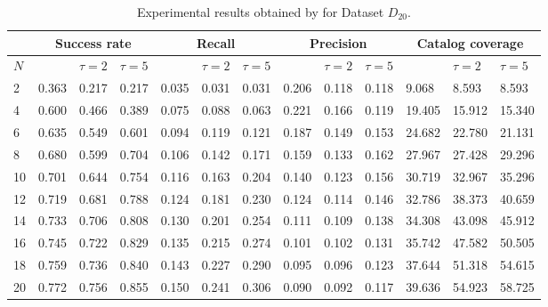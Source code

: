 \begin{table*}[t!]
	\small
	\caption{Experimental results obtained by \TFb for Dataset $D_{20}$.}
	\begin{tabular}{|l | lll| lll |lll |lll|}
		\hline
		& \multicolumn{3}{c|}{\textbf{Success rate}} & \multicolumn{3}{c|}{\textbf{Recall}} & \multicolumn{3}{c|}{\textbf{Precision}} & \multicolumn{3}{c|}{ \textbf{Catalog coverage}} \\ \hline
		$N$  & \MNB     & $\tau=2$   & $\tau=5$  & \MNB      & $\tau=2$   & $\tau=5$   & \MNB       & $\tau=2$   & $\tau=5$    & \MNB        & $\tau=2$     & $\tau=5$      \\ \hline
		
		2  & 0.363     & 0.217    & 0.217  & 0.035   & 0.031   & 0.031  & 0.206    & 0.118   & 0.118   & 9.068     & 8.593      & 8.593      \\ \hline		
		4  & 0.600     & 0.466    & 0.389  & 0.075   & 0.088   & 0.063  & 0.221    & 0.166   & 0.119   & 19.405    & 15.912     & 15.340     \\ \hline
		6  & 0.635     & 0.549    & 0.601  & 0.094   & 0.119   & 0.121  & 0.187    & 0.149   & 0.153   & 24.682    & 22.780     & 21.131     \\ \hline
		\rowcolor{Gray}
		8  & 0.680    & 0.599    & 0.704  & 0.106   & 0.142   & 0.171  & 0.159    & 0.133    & 0.162   & 27.967    & 27.428     & 29.296     \\ \hline
		10 & 0.701    & 0.644    & 0.754  & 0.116   & 0.163   & 0.204  & 0.140    & 0.123    & 0.156      & 30.719    & 32.967     & 35.296  \\ \hline		
		12 & 0.719    & 0.681    & 0.788  & 0.124   & 0.181   & 0.230  & 0.124    & 0.114    & 0.146   & 32.786    & 38.373     & 40.659     \\ \hline		
		14 & 0.733    & 0.706    & 0.808  & 0.130   & 0.201   & 0.254  & 0.111    & 0.109    & 0.138   & 34.308    & 43.098     & 45.912     \\ \hline		
		16 & 0.745    & 0.722    & 0.829  & 0.135   & 0.215   & 0.274  &  0.101   & 0.102    & 0.131   & 35.742    & 47.582     & 50.505     \\ \hline		
		18 & 0.759    & 0.736    & 0.840  & 0.143   & 0.227   & 0.290  & 0.095    & 0.096    & 0.123   & 37.644    & 51.318     & 54.615     \\ \hline
		20 & 0.772    & 0.756    & 0.855 & 0.150    & 0.241   & 0.306  & 0.090    & 0.092    & 0.117  & 39.636    & 54.923     & 58.725    \\ \hline
	\end{tabular}
	\vspace{.2cm}
	\label{tab:combined_dt20}
\end{table*}